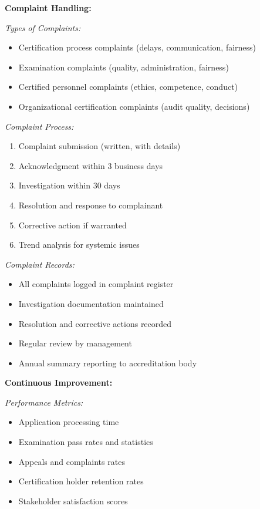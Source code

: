 \documentclass[11pt,a4paper]{article}
\begin{document}
\textbf{Complaint Handling:}

\textit{Types of Complaints:}
\begin{itemize}
\item Certification process complaints (delays, communication, fairness)
\item Examination complaints (quality, administration, fairness)
\item Certified personnel complaints (ethics, competence, conduct)
\item Organizational certification complaints (audit quality, decisions)
\end{itemize}

\textit{Complaint Process:}
\begin{enumerate}
\item Complaint submission (written, with details)
\item Acknowledgment within 3 business days
\item Investigation within 30 days
\item Resolution and response to complainant
\item Corrective action if warranted
\item Trend analysis for systemic issues
\end{enumerate}

\textit{Complaint Records:}
\begin{itemize}
\item All complaints logged in complaint register
\item Investigation documentation maintained
\item Resolution and corrective actions recorded
\item Regular review by management
\item Annual summary reporting to accreditation body
\end{itemize}

\textbf{Continuous Improvement:}

\textit{Performance Metrics:}
\begin{itemize}
\item Application processing time
\item Examination pass rates and statistics
\item Appeals and complaints rates
\item Certification holder retention rates
\item Stakeholder satisfaction scores
\end{itemize}
\end{document}
